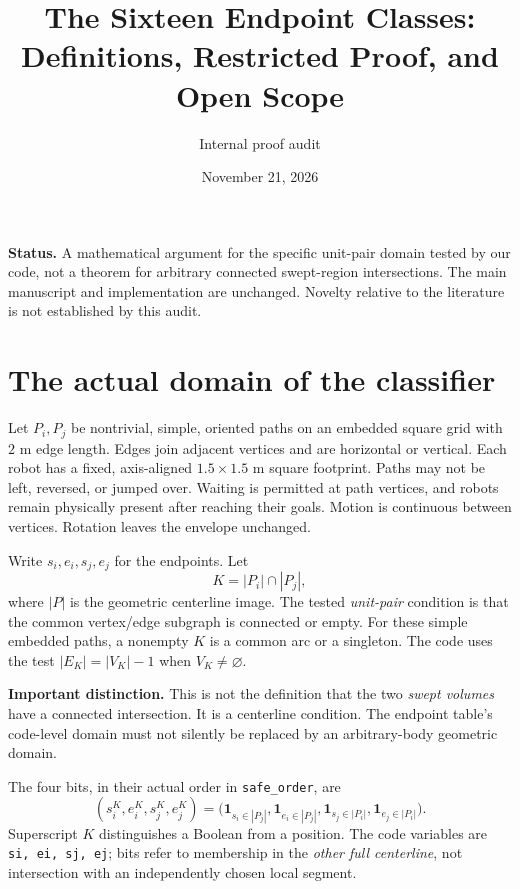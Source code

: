 \documentclass[11pt,a4paper]{article}
\title{The Sixteen Endpoint Classes:\\Definitions, Restricted Proof, and Open Scope}
\author{Internal proof audit}
\date{November 21, 2026}
\begin{document}
\maketitle
\noindent\textbf{Status.} A mathematical argument for the specific unit-pair
domain tested by our code, not a theorem for arbitrary connected swept-region
intersections. The main manuscript and implementation are unchanged. Novelty
relative to the literature is not established by this audit.

\section{The actual domain of the classifier}
Let $P_i,P_j$ be nontrivial, simple, oriented paths on an embedded square grid
with $2$ m edge length. Edges join adjacent vertices and are horizontal or
vertical. Each robot has a fixed, axis-aligned $1.5\times1.5$ m square footprint.
Paths may not be left, reversed, or jumped over. Waiting is permitted at path
vertices, and robots remain physically present after reaching their goals.
Motion is continuous between vertices. Rotation leaves the envelope unchanged.

Write $s_i,e_i,s_j,e_j$ for the endpoints. Let
\begin{equation}
K=|P_i|\cap|P_j|,
\end{equation}
where $|P|$ is the geometric centerline image. The tested \emph{unit-pair}
condition is that the common vertex/edge subgraph is connected or empty.
For these simple embedded paths, a nonempty $K$ is a common arc or a singleton.
The code uses the test $|E_K|=|V_K|-1$ when $V_K\ne\varnothing$.

\textbf{Important distinction.} This is not the definition that the two
\emph{swept volumes} have a connected intersection. It is a centerline condition.
The endpoint table's code-level domain must not silently be replaced by an
arbitrary-body geometric domain.

The four bits, in their actual order in \texttt{safe\_order}, are
\begin{equation}
(s_i^K,e_i^K,s_j^K,e_j^K)
=\bigl(\mathbf1_{s_i\in|P_j|},\mathbf1_{e_i\in|P_j|},
\mathbf1_{s_j\in|P_i|},\mathbf1_{e_j\in|P_i|}\bigr).
\label{eq:bits}
\end{equation}
Superscript $K$ distinguishes a Boolean from a position. The code variables
are \texttt{si, ei, sj, ej}; bits refer to membership in the \emph{other full
centerline}, not intersection with an independently chosen local segment.
\end{document}
